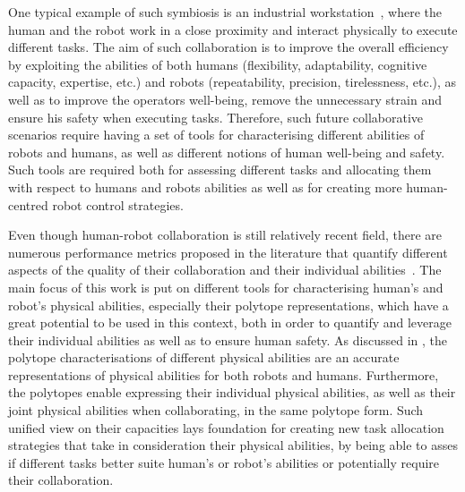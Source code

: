 One typical example of such symbiosis is an industrial workstation~\cite{SIMOES2022workplace}, where the human and the robot work in a close proximity and interact physically to execute different tasks. The aim of such collaboration is to improve the overall efficiency by exploiting the abilities of both humans (flexibility, adaptability, cognitive capacity, expertise, etc.) and robots (repeatability, precision, tirelessness, etc.), as well as to improve the operators well-being, remove the unnecessary strain and ensure his safety when executing tasks. Therefore, such future collaborative scenarios require having a set of tools for characterising different abilities of robots and humans, as well as different notions of human well-being and safety. Such tools are required both for assessing different tasks and allocating them with respect to humans and robots abilities as well as for creating more human-centred robot control strategies.


Even though human-robot collaboration is still relatively recent field, there are numerous performance metrics proposed in the literature that quantify different aspects of the quality of their collaboration and their individual abilities~\cite{CORONADO2022collab_quality}.
The main focus of this work is put on different tools for characterising human's and robot's physical abilities, especially their polytope representations, which have a great potential to be used in this context, both in order to quantify and leverage their individual abilities as well as to ensure human safety. As discussed in , the polytope characterisations of different physical abilities are an accurate representations of physical abilities for both robots and humans. Furthermore, the polytopes enable expressing their individual physical abilities, as well as their joint physical abilities when collaborating, in the same polytope form. Such unified view on their capacities lays foundation for creating new task allocation strategies that take in consideration their physical abilities, by being able to asses if different tasks better suite human's or robot's abilities or potentially require their collaboration. 

